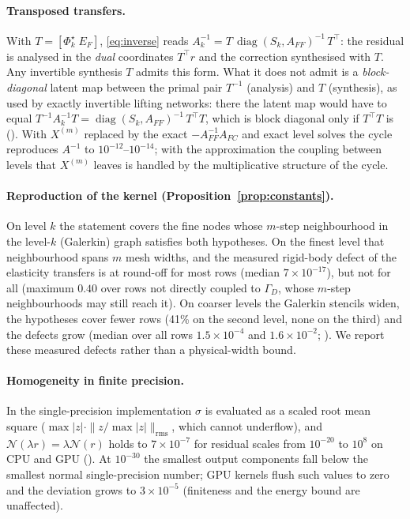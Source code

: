 \paragraph{Transposed transfers.} With $T = [\Phi_k^\star\;E_F]$, \eqref{eq:inverse} reads
$A_k^{-1} = T\,\operatorname{diag}(S_k,A_{FF})^{-1}\,T^\top$: the residual is analysed in the \emph{dual} coordinates $T^\top r$
and the correction synthesised with $T$. Any invertible synthesis $T$ admits this form. What it does not admit is a
\emph{block-diagonal} latent map between the primal pair $T^{-1}$ (analysis) and $T$ (synthesis), as used by exactly
invertible lifting networks: there the latent map would have to equal $T^{-1}A_k^{-1}T = \operatorname{diag}(S_k,A_{FF})^{-1}\,T^\top T$,
which is block diagonal only if $T^\top T$ is (). With $X^{(m)}$ replaced by the
exact $-A_{FF}^{-1}A_{FC}$ and exact level solves the cycle reproduces $A^{-1}$ to $10^{-12}$--$10^{-14}$; with the approximation
the coupling between levels that $X^{(m)}$ leaves is handled by the multiplicative structure of the cycle.

\paragraph{Reproduction of the kernel (Proposition~\ref{prop:constants}).} On level $k$ the statement covers the fine nodes
whose $m$-step neighbourhood in the level-$k$ (Galerkin) graph satisfies both hypotheses. On the finest level that
neighbourhood spans $m$ mesh widths, and the measured rigid-body defect of the elasticity transfers is at round-off for most
rows (median $7\times10^{-17}$), but not for all (maximum $0.40$ over rows not directly coupled to $\Gamma_D$, whose $m$-step
neighbourhoods may still reach it). On coarser levels the Galerkin stencils widen, the hypotheses cover fewer rows (41\% on the
second level, none on the third) and the defects grow (median over all rows $1.5\times10^{-4}$ and $1.6\times10^{-2}$;
). We report these measured defects rather than a physical-width bound.

\paragraph{Homogeneity in finite precision.} In the single-precision implementation $\sigma$ is evaluated as a scaled root
mean square ($\max|z|\cdot\|z/\max|z|\|_{\mathrm{rms}}$, which cannot underflow), and $\mathcal{N}(\lambda r) = \lambda\mathcal{N}(r)$
holds to $7\times10^{-7}$ for residual scales from $10^{-20}$ to $10^{8}$ on CPU and GPU ().
At $10^{-30}$ the smallest output components fall below the smallest normal single-precision number; GPU kernels flush such
values to zero and the deviation grows to $3\times10^{-5}$ (finiteness and the energy bound are unaffected).

